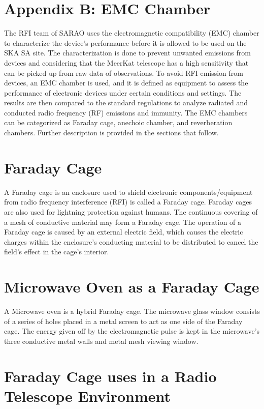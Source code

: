 \documentclass[12pt,a4paper]{report}
\begin{document}
	
	{\section{Appendix B: EMC Chamber}
		
		The RFI team of SARAO uses the electromagnetic compatibility (EMC) chamber to characterize the device's performance before it is allowed to be used on the SKA SA site. The characterization is done to prevent unwanted emissions from devices and considering that the MeerKat telescope has a high sensitivity that can be picked up from raw data of observations. To avoid RFI emission from devices, an EMC chamber is used, and it is defined as equipment to assess the performance of electronic devices under certain conditions and settings. The results are then compared to the standard regulations to analyze radiated and conducted radio frequency (RF) emissions and immunity. The EMC chambers can be categorized as Faraday cage, anechoic chamber, and reverberation chambers. Further description is provided in the sections that follow.
		
		\section*{Faraday Cage}
		A Faraday cage is an enclosure used to shield electronic components/equipment from radio frequency interference (RFI) is called a Faraday cage. Faraday cages are also used for lightning protection against humans. The continuous covering of a mesh of conductive material may form a Faraday cage. The operation of a Faraday cage is caused by an external electric field, which causes the electric charges within the enclosure's conducting material to be distributed to cancel the field's effect in the cage's interior.
		
		\section*{Microwave Oven as a Faraday Cage}
		
		A Microwave oven is a hybrid Faraday cage. The microwave glass window consists of a series of holes placed in a metal screen to act as one side of the Faraday cage. The energy given off by the electromagnetic pulse is kept in the microwave's three conductive metal walls and metal mesh viewing window.
		
		\section*{Faraday Cage uses in a Radio Telescope Environment}
		
}
\end{document}
